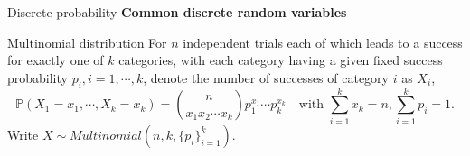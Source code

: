 \documentclass [aspectratio=169]{beamer}
\begin{document}
\begin{frame}{Discrete probability}
\textbf{Common discrete random variables}
\begin{block}{Multinomial distribution}
For $n$ independent trials each of which leads to a success for exactly one of $k$ categories, with each category having a given fixed success probability $p_i, i =1, \cdots, k$, denote the number of successes of category $i$ as $X_i$, 
$$
\mathbb{P}(X_1 = x_1, \cdots, X_k = x_k) = \binom{n}{x_1 x_2 \cdots x_k}p_1^{x_1}\cdots p_k^{x_k}\quad \text{with } \sum_{i = 1}^k x_k = n, \sum_{i = 1}^k p_i = 1.
$$
Write $X \sim Multinomial(n, k, \{p_i\}_{i = 1}^k)$.
\end{block}
\end{frame}

\end{document}

